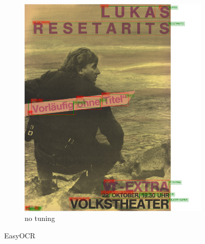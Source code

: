 \begin{figure}[hbtp!]
    \begin{subfigure}{\textwidth}
        \centering
        \includegraphics[scale=0.29]{obrazky/plakaty/result_easyOCR_vienna2_nosplit_notuning_nocorrection-83.png}
        \caption{no tuning}
        \label{Im3:ex:easy}
    \end{subfigure}
    \caption{EasyOCR}
    \label{Im3:ex:EasyOCR}
\end{figure}

